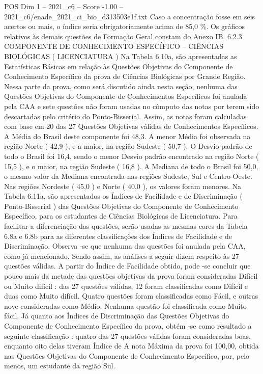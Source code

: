 \begin{textsample}{POS Dim 1 – 2021\_c6 – Score -1.00 – 2021\_c6/enade\_2021\_ci\_bio\_d313503e1f.txt}
Caso a concentração fosse em seis acertos ou mais, o índice seria obrigatoriamente acima de 85,0 \%.
Os gráficos relativos às demais questões de Formação Geral constam do Anexo IB. 6.2.3 COMPONENTE DE CONHECIMENTO ESPECÍFICO – CIÊNCIAS BIOLÓGICAS ( LICENCIATURA ) Na Tabela 6.10a, são apresentadas as Estatísticas Básicas em relação às Questões Objetivas do Componente de Conhecimento Específico da prova de Ciências Biológicas por Grande Região.
Nessa parte da prova, como será discutido ainda nesta seção, nenhuma das Questões Objetivas do Componente de Conhecimentos Específicos foi anulada pela CAA e sete questões não foram usadas no cômputo das notas por terem sido descartadas pelo critério do Ponto-Bisserial.
Assim, as notas foram calculadas com base em 20 das 27 Questões Objetivas válidas de Conhecimentos Específicos.
A Média do Brasil deste componente foi 48,3.
A menor Média foi observada na região Norte ( 42,9 ), e a maior, na região Sudeste ( 50,7 ).
O Desvio padrão de todo o Brasil foi 16,4, sendo o menor Desvio padrão encontrado na região Norte ( 15,5 ), e o maior, na região Sudeste ( 16,8 ).
A Mediana de todo o Brasil foi 50,0, o mesmo valor da Mediana encontrada nas regiões Sudeste, Sul e Centro-Oeste.
Nas regiões Nordeste ( 45,0 ) e Norte ( 40,0 ), os valores foram menores.
Na Tabela 6.11a, são apresentados os Índices de Facilidade e de Discriminação ( Ponto-Bisserial ) das Questões Objetivas do Componente de Conhecimento Específico, para os estudantes de Ciências Biológicas de Licenciatura.
Para facilitar a diferenciação das questões, serão usadas as mesmas cores da Tabela 6.8a e 6.8b para as diferentes classificações dos Índices de Facilidade e de Discriminação.
Observa -se que nenhuma das questões foi anulada pela CAA, como já mencionado.
Sendo assim, as análises a seguir dizem respeito às 27 questões válidas.
A partir do Índice de Facilidade obtido, pode -se concluir que pouco mais da metade das questões objetivas da prova foram consideradas Difícil ou Muito difícil : das 27 questões válidas, 12 foram classificadas como Difícil e duas como Muito difícil.
Quatro questões foram classificadas como Fácil, e outras nove consideradas como Médio.
Nenhuma questão foi classificada como Muito fácil.
Já quanto aos Índices de Discriminação das Questões Objetivas do Componente de Conhecimento Específico da prova, obtém -se como resultado a seguinte classificação : quatro das 27 questões válidas foram consideradas boas, enquanto oito delas tiveram Índice de A nota Máxima da prova foi 100,00, obtida nas Questões Objetivas do Componente de Conhecimento Específico, por, pelo menos, um estudante da região Sul.

\end{textsample}
